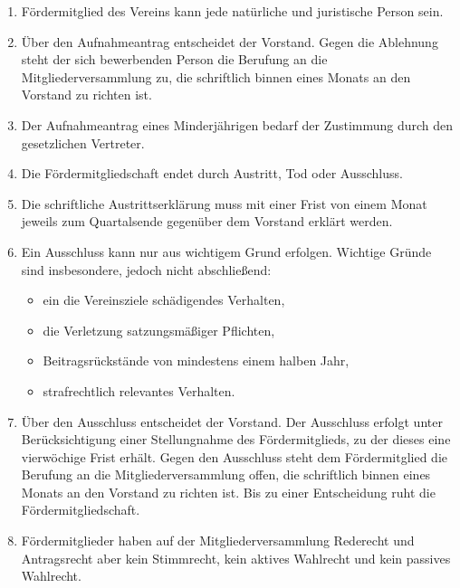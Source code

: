 \documentclass[10pt,conference,a4paper,nofonttune]{IEEEtran}
\begin{document}
\begin{enumerate}
  \item Fördermitglied des Vereins kann jede natürliche und juristische Person sein.

  \item Über den Aufnahmeantrag entscheidet der Vorstand. Gegen die Ablehnung
    steht der sich bewerbenden Person die Berufung an die Mitgliederversammlung
    zu, die schriftlich binnen eines Monats an den Vorstand zu richten ist.

  \item Der Aufnahmeantrag eines Minderjährigen bedarf der Zustimmung durch den
    gesetzlichen Vertreter.

  \item Die Fördermitgliedschaft endet durch Austritt, Tod oder Ausschluss.

  \item Die schriftliche Austrittserklärung muss mit einer Frist von einem Monat
    jeweils zum Quartalsende gegenüber dem Vorstand erklärt werden.

  \item Ein Ausschluss kann nur aus wichtigem Grund erfolgen. Wichtige Gründe
    sind insbesondere, jedoch nicht abschließend:
    \begin{itemize}
      \item ein die Vereinsziele schädigendes Verhalten,

      \item die Verletzung satzungsmäßiger Pflichten,

      \item Beitragsrückstände von mindestens einem halben Jahr,

      \item strafrechtlich relevantes Verhalten.
    \end{itemize}

  \item Über den Ausschluss entscheidet der Vorstand. Der Ausschluss erfolgt
    unter Berücksichtigung einer Stellungnahme des Fördermitglieds, zu der dieses eine
    vierwöchige Frist erhält. Gegen den Ausschluss steht dem Fördermitglied die
    Berufung an die Mitgliederversammlung offen, die schriftlich binnen eines
    Monats an den Vorstand zu richten ist. Bis zu einer Entscheidung ruht die
    Fördermitgliedschaft.

  \item Fördermitglieder haben auf der Mitgliederversammlung Rederecht und 
    Antragsrecht aber kein Stimmrecht, kein aktives Wahlrecht und kein passives Wahlrecht.
\end{enumerate}
\end{document}
